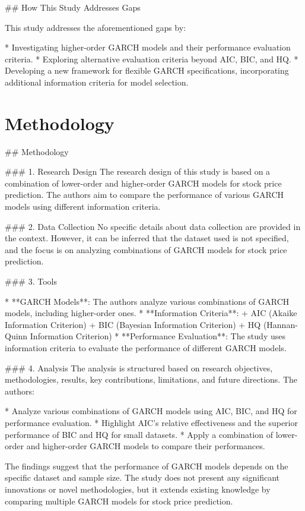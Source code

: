\documentclass[conference]{IEEEtran}
\begin{document}
\#\# How This Study Addresses Gaps

This study addresses the aforementioned gaps by:

*   Investigating higher-order GARCH models and their performance evaluation criteria.
*   Exploring alternative evaluation criteria beyond AIC, BIC, and HQ.
*   Developing a new framework for flexible GARCH specifications, incorporating additional information criteria for model selection.

\section{Methodology}
\#\# Methodology

\#\#\# 1. Research Design
The research design of this study is based on a combination of lower-order and higher-order GARCH models for stock price prediction. The authors aim to compare the performance of various GARCH models using different information criteria.

\#\#\# 2. Data Collection
No specific details about data collection are provided in the context. However, it can be inferred that the dataset used is not specified, and the focus is on analyzing combinations of GARCH models for stock price prediction.

\#\#\# 3. Tools

* **GARCH Models**: The authors analyze various combinations of GARCH models, including higher-order ones.
* **Information Criteria**:
 + AIC (Akaike Information Criterion)
 + BIC (Bayesian Information Criterion)
 + HQ (Hannan-Quinn Information Criterion)
* **Performance Evaluation**: The study uses information criteria to evaluate the performance of different GARCH models.

\#\#\# 4. Analysis
The analysis is structured based on research objectives, methodologies, results, key contributions, limitations, and future directions. The authors:

* Analyze various combinations of GARCH models using AIC, BIC, and HQ for performance evaluation.
* Highlight AIC's relative effectiveness and the superior performance of BIC and HQ for small datasets.
* Apply a combination of lower-order and higher-order GARCH models to compare their performances.

The findings suggest that the performance of GARCH models depends on the specific dataset and sample size. The study does not present any significant innovations or novel methodologies, but it extends existing knowledge by comparing multiple GARCH models for stock price prediction.
\end{document}
